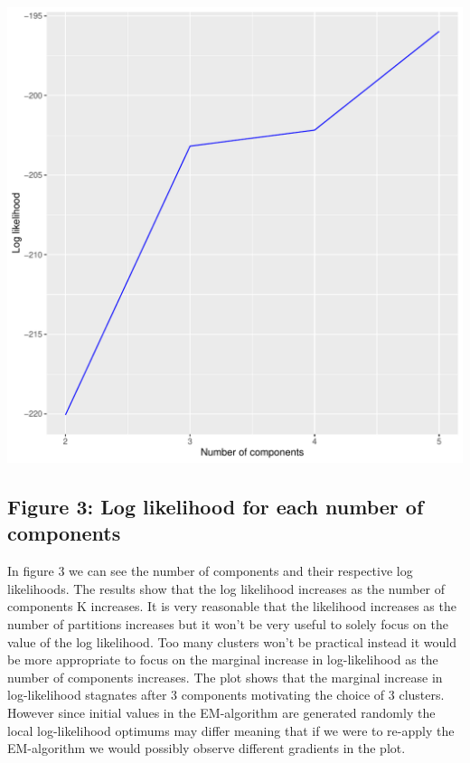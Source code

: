\documentclass{article}\usepackage[]{graphicx}\usepackage[]{color}
\makeatletter
\def\maxwidth{ %
  \ifdim\Gin@nat@width>\linewidth
    \linewidth
  \else
    \Gin@nat@width
  \fi
}
\newenvironment{knitrout}{}{} %
\makeatother
\begin{document}
\begin{knitrout}
\color{fgcolor}
\includegraphics[width=\maxwidth]{figure/unnamed-chunk-15-1} 

\end{knitrout}

\subsection*{Figure 3: Log likelihood for each number of components}

In figure 3 we can see the number of components and their respective log likelihoods. The results show that the log likelihood increases as the number of components K increases. It is very reasonable that the likelihood increases as the number of partitions increases but it won’t be very useful to solely focus on the value of the log likelihood. Too many clusters won’t be practical instead it would be more appropriate to focus on the marginal increase in log-likelihood as the number of components increases. The plot shows that the marginal increase in log-likelihood stagnates after 3 components motivating the choice of 3 clusters. However since initial values in the EM-algorithm are generated randomly the local log-likelihood optimums may differ meaning that if we were to re-apply the EM-algorithm we would possibly observe different gradients in the plot.
\end{document}
